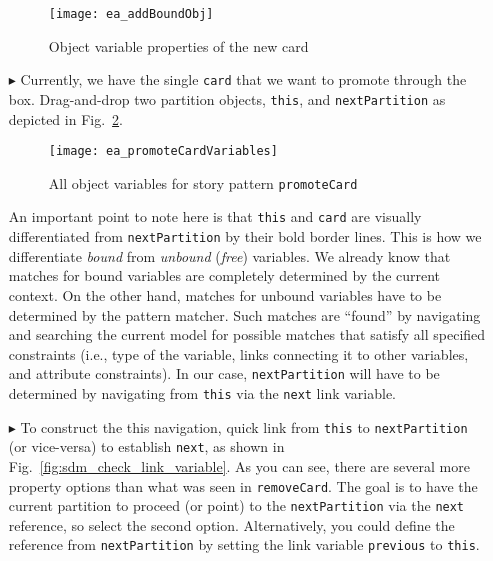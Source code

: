 \begin{itemize}
\begin{figure}[htbp]
\begin{center}
  \texttt{[image: ea\_addBoundObj]}
  \caption{Object variable properties of the new card}
  \label{fig:sdm_new_card_properties}
\end{center}
\end{figure}

\vspace{0.5cm}

\item[$\blacktriangleright$] Currently, we have the single \texttt{card} that we want to promote through the box. Drag-and-drop two partition objects,
\texttt{this}, and \texttt{nextPartition} as depicted in Fig.~\ref{fig:sdm_check_complete_sp}.

\vspace{0.5cm}

\begin{figure}[htbp]
\begin{center}
  \texttt{[image: ea\_promoteCardVariables]}
  \caption{All object variables for story pattern \texttt{promoteCard}}
  \label{fig:sdm_check_complete_sp}
\end{center}
\end{figure}

An important point to note here is that \texttt{this} and \texttt{card} are visually differentiated from \texttt{nextPartition} by
their bold border lines. This is how we differentiate \emph{bound} from \emph{unbound} (\emph{free}) variables. We already know that matches for bound
variables are completely determined by the current context. On the other hand, matches for unbound variables have to be determined by the pattern matcher. Such
matches are ``found'' by navigating and searching the current model for possible matches that satisfy all specified constraints (i.e., type of the variable,
links connecting it to other variables, and attribute constraints). In our case, \texttt{nextPartition} will have to be determined by navigating from
\texttt{this} via the \texttt{next} link variable.

\vspace{0.5cm}

\item[$\blacktriangleright$] To construct the this navigation, quick link from \texttt{this} to \texttt{nextPartition} (or vice-versa) to establish
\texttt{next}, as shown in Fig.~\ref{fig:sdm_check_link_variable}. As you can see, there are several more property options than what was seen in
\texttt{removeCard}. The goal is to have the current partition to proceed (or point) to the \texttt{nextPartition} via the \texttt{next} reference, so select
the second option. Alternatively, you could define the reference from \texttt{nextPartition} by setting the link variable \texttt{previous} to \texttt{this}.


\end{itemize}
